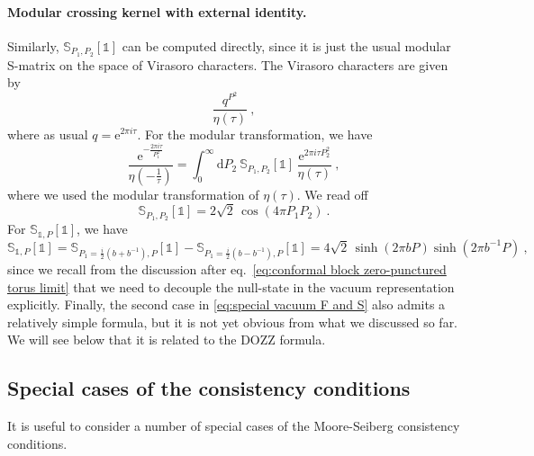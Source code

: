 \documentclass[12pt,a4paper]{article}
\newcommand{\be}{\begin{equation}}
\newcommand{\ee}{\end{equation}}
\renewcommand\d{\text{d}}
\newcommand\id{\mathds{1}}
\begin{document}
\paragraph{Modular crossing kernel with external identity.}
Similarly, $\mathbb{S}_{P_1,P_2}[\id]$ can be computed directly, since it is just the usual modular S-matrix on the space of Virasoro characters. The Virasoro characters are given by
\be 
\frac{q^{P^2}}{\eta(\tau)}\ ,
\ee
where as usual $q=\mathrm{e}^{2\pi i \tau}$.
For the modular transformation, we have
\be 
\frac{\mathrm{e}^{-\frac{2\pi i \tau}{P_1^2}}}{\eta(-\frac{1}{\tau})}
=\int_0^\infty\!\! \d P_2\ \mathbb{S}_{P_1,P_2}[\id] \, \frac{\mathrm{e}^{2\pi i \tau P_2^2}}{\eta(\tau)}\ ,
\ee
where we used the modular transformation of $\eta(\tau)$. We read off
\be 
\mathbb{S}_{P_1,P_2}[\id]=2 \sqrt{2}\, \cos(4\pi P_1 P_2)\ . \label{eq:SP1,P2[1]}
\ee
For $\mathbb{S}_{\id,P}[\id]$, we have
\be 
\mathbb{S}_{\id,P}[\id]=\mathbb{S}_{P_1=\frac{i}{2}(b+b^{-1}),P}[\id]-\mathbb{S}_{P_1=\frac{i}{2}(b-b^{-1}),P}[\id]=4 \sqrt{2}\, \sinh(2\pi b P) \sinh(2\pi b^{-1} P)\ , \label{eq:S1P[1] computation}
\ee
since we recall from the discussion after eq.~\eqref{eq:conformal block zero-punctured torus limit} that we need to decouple the null-state in the vacuum representation explicitly. 
Finally, the second case in \eqref{eq:special vacuum F and S} also admits a relatively simple formula, but it is not yet obvious from what we discussed so far. We will see below that it is related to the DOZZ formula.


\subsection{Special cases of the consistency conditions} \label{subsec:special cases consistency conditions}
It is useful to consider a number of special cases of the Moore-Seiberg consistency conditions. 
\end{document}
